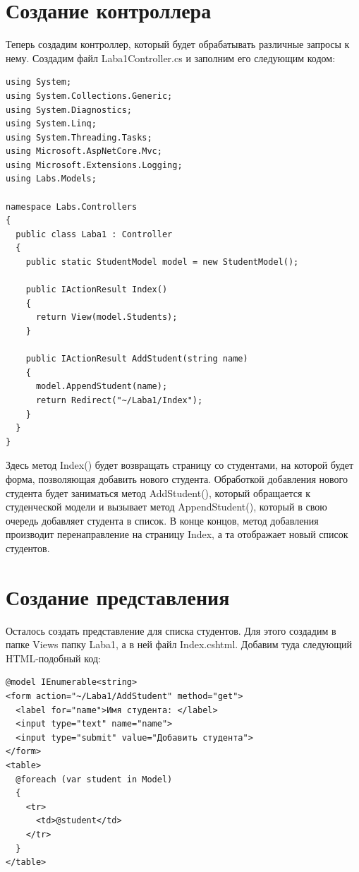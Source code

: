 \documentclass[a4paper,14pt]{extreport}
\begin{document}
\section{Создание контроллера}
Теперь создадим контроллер, который будет обрабатывать различные запросы к нему. Создадим файл Laba1Controller.cs и заполним его следующим кодом:

\lstset{language=java}
\begin{lstlisting}[basicstyle=\small]
using System;
using System.Collections.Generic;
using System.Diagnostics;
using System.Linq;
using System.Threading.Tasks;
using Microsoft.AspNetCore.Mvc;
using Microsoft.Extensions.Logging;
using Labs.Models;

namespace Labs.Controllers
{
  public class Laba1 : Controller
  {
    public static StudentModel model = new StudentModel();

    public IActionResult Index()
    {
      return View(model.Students);
    }

    public IActionResult AddStudent(string name)
    {
      model.AppendStudent(name);
      return Redirect("~/Laba1/Index");
    }
  }
}
\end{lstlisting}

Здесь метод Index() будет возвращать страницу со студентами, на которой будет форма, позволяющая добавить нового студента. Обработкой добавления нового студента будет заниматься метод AddStudent(), который обращается к студенческой модели и вызывает метод AppendStudent(), который в свою очередь добавляет студента в список. В конце концов, метод добавления производит перенаправление на страницу Index, а та отображает новый список студентов.

\section{Создание представления}
Осталось создать представление для списка студентов. Для этого создадим в папке Views папку Laba1, а в ней файл Index.cshtml. Добавим туда следующий HTML-подобный код:

\lstset{language=HTML}
\lstset{extendedchars=\true}
\begin{lstlisting}[basicstyle=\small]
@model IEnumerable<string>
<form action="~/Laba1/AddStudent" method="get">
  <label for="name">Имя студента: </label>
  <input type="text" name="name">
  <input type="submit" value="Добавить студента">
</form>
<table>
  @foreach (var student in Model)
  { 
    <tr>
      <td>@student</td>
    </tr>
  }
</table>
\end{lstlisting}
\end{document}

